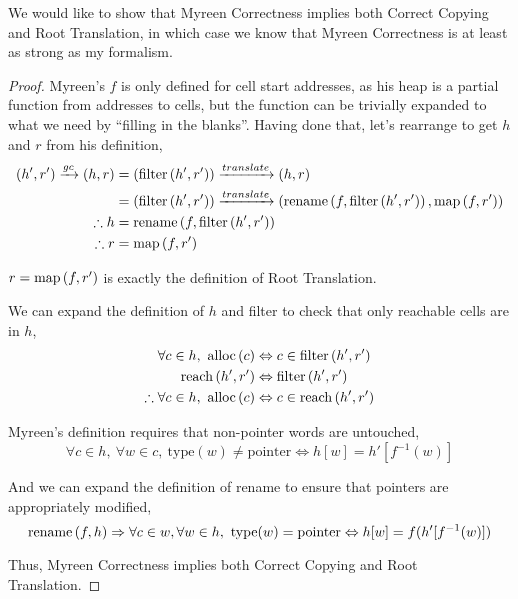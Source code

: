 \begin{theorem}
  We would like to show that Myreen Correctness implies both Correct
  Copying and Root Translation, in which case we know that Myreen
  Correctness is at least as strong as my formalism.

  \begin{proof}
    Myreen's $f$ is only defined for cell start addresses, as his heap
    is a partial function from addresses to cells, but the function
    can be trivially expanded to what we need by ``filling in the
    blanks''. Having done that, let's rearrange to get $h$ and $r$
    from his definition,
    \begin{align*}
      (h', r') \xrightarrow{gc} (h, r) &= (\mathrm{filter}\left(h', r'\right)) \xrightarrow{translate} (h, r)\\
      &= (\mathrm{filter}\left(h', r'\right)) \xrightarrow{translate} (\mathrm{rename}\left(f, \mathrm{filter}\left(h', r'\right)\right), \mathrm{map}\left(f, r'\right))\\
      \therefore h &= \mathrm{rename}\left(f, \mathrm{filter}\left(h', r'\right)\right)\\
      \therefore r &= \mathrm{map}\left(f, r'\right)
    \end{align*}

    $r = \mathrm{map}\left(f, r'\right)$ is exactly the definition of Root Translation.

    We can expand the definition of $h$ and filter to check that only
    reachable cells are in $h$,
    \begin{align*}
      \forall c \in h,\ \mathrm{alloc}\left(c\right) &\Leftrightarrow c \in \mathrm{filter}\left(h', r'\right)\\
      \mathrm{reach}\left(h', r'\right) &\Leftrightarrow \mathrm{filter}\left(h', r'\right)\\
      \therefore \forall c \in h,\ \mathrm{alloc}\left(c\right) &\Leftrightarrow c \in \mathrm{reach}\left(h', r'\right)
    \end{align*}

    Myreen's definition requires that non-pointer words are
    untouched, \[\forall c \in h,\ \forall w \in c,\ \mathrm{type}(w)
    \neq \mathrm{pointer} \iff h[w] = h'[f^{-1}(w)]\]

    And we can expand the definition of rename to ensure that pointers
    are appropriately modified, \[\mathrm{rename}\left(f, h\right) \Rightarrow \forall c \in
    w, \forall w \in h,\ \mathrm{type}(w) = \mathrm{pointer} \Leftrightarrow h[w]
    = f(h'[f^{-1}(w)])\]

    Thus, Myreen Correctness implies both Correct Copying and Root
    Translation.
  \end{proof}
\end{theorem}


